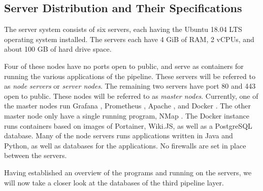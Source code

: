 \subsection{Server Distribution and Their Specifications}
The \knox{} server system consists of six servers, each having the Ubuntu 18.04 LTS operating system installed. The servers each have 4 GiB of RAM, 2 vCPUs, and about 100 GB of hard drive space. 

Four of these nodes have no ports open to public, and serve as containers for running the various applications of the \knox{} pipeline.
These servers will be referred to as \textit{node servers} or \textit{server nodes}.
The remaining two servers have port 80 and 443 open to public. These nodes will be referred to as \textit{master nodes}.
Currently, one of the master nodes run Grafana \cite{GRAFANA}, Prometheus \cite{Prometheus}, Apache \cite{ApacheJena}, and Docker \cite{Docker_IBM}.
The other master node only have a single running program, NMap \cite{NMap}.
The Docker instance runs containers based on images of Portainer, Wiki.JS, as well as a PostgreSQL database.
Many of the node servers runs applications written in Java and Python, as well as databases for the applications. 
No firewalls are set in place between the servers.

Having established an overview of the programs and running on the servers, we will now take a closer look at the databases of the third pipeline layer.

